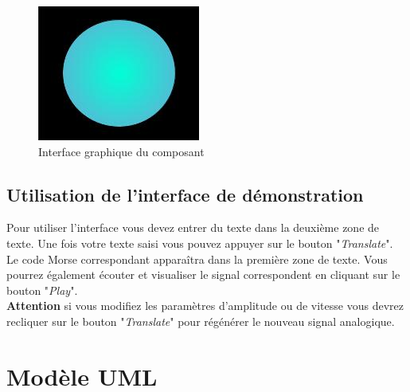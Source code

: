 \documentclass[a4paper,11pt]{article}
\begin{document}
    \begin{figure}[H]
        \begin{center}
            \includegraphics[scale=1]{comdescpicture.jpg}
            \caption{Interface graphique du composant}
            \label{Interface graphique du composant}
        \end{center}
    \end{figure}
    \subsection{Utilisation de l'interface de démonstration}
    Pour utiliser l'interface vous devez entrer du texte dans la deuxième zone de texte. Une fois votre texte saisi vous pouvez appuyer sur le bouton "\textit{Translate}". Le code Morse correspondant apparaîtra dans la première zone de texte. Vous pourrez également écouter et visualiser le signal correspondent en cliquant sur le bouton "\textit{Play}".\\
    \textbf{Attention} si vous modifiez les paramètres d'amplitude ou de vitesse vous devrez recliquer sur le bouton "\textit{Translate}" pour régénérer le nouveau signal analogique.


    \section{Modèle UML}
\end{document}
